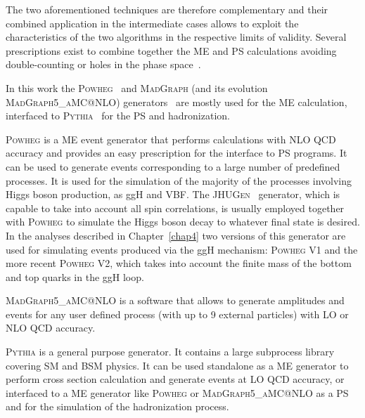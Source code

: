 The two aforementioned techniques are therefore complementary and their combined application in the intermediate cases allows to exploit the characteristics of the two algorithms in the respective limits of validity. Several prescriptions exist to combine together the ME and PS calculations avoiding double-counting or holes in the phase space~\cite{Hoche:2006ph}.

In this work the \textsc{Powheg}~\cite{Kramer:2005hw,Frixione:2007vw,Lavesson:2008ah,Alioli:2008tz, Nason:2009ai} and \textsc{MadGraph} (and its evolution \textsc{MadGraph5\_aMC@NLO}) generators~\cite{Alwall:2014hca} are mostly used for the ME calculation, interfaced to \textsc{Pythia}~\cite{Sjostrand:2006za,Sjostrand:2007gs} for the PS and hadronization. 

\textsc{Powheg} is a ME event generator that performs calculations with NLO QCD accuracy and provides an easy prescription for the interface to PS programs. It can be used to generate events corresponding to a large number of predefined processes. It is used for the simulation of the majority of the processes involving Higgs boson production, as ggH and VBF. The \textsc{JHUGen}~\cite{JHUGen} generator, which is capable to take into account all spin correlations, is usually employed together with \textsc{Powheg} to simulate the Higgs boson decay to whatever final state is desired. In the analyses described in Chapter~\ref{chap4} two versions of this generator are used for simulating events produced via the ggH mechanism: \textsc{Powheg V1} and the more recent \textsc{Powheg V2}, which takes into account the finite mass of the bottom and top quarks in the ggH loop.

\textsc{MadGraph5\_aMC@NLO} is a software that allows to generate amplitudes and events for any user defined process (with up to 9 external particles) with LO or NLO QCD accuracy.

\textsc{Pythia} is a general purpose generator. It contains a large subprocess library covering SM and BSM physics. It can be used standalone as a ME generator to perform cross section calculation and generate events at LO QCD accuracy, or interfaced to a ME generator like \textsc{Powheg} or \textsc{MadGraph5\_aMC@NLO} as a PS and for the simulation of the hadronization process.

